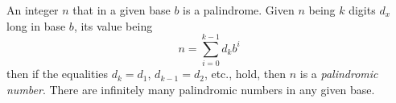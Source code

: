 \documentclass{article}
\begin{document}
An integer $n$ that in a given base $b$ is a palindrome. Given $n$ being $k$ digits $d_x$ long in base $b$, its value being $$n = \sum_{i = 0}^{k - 1} d_kb^i$$ then if the equalities $d_k = d_1$, $d_{k - 1} = d_2$, etc., hold, then $n$ is a {\em palindromic number}. There are infinitely many palindromic numbers in any given base.
\end{document}

